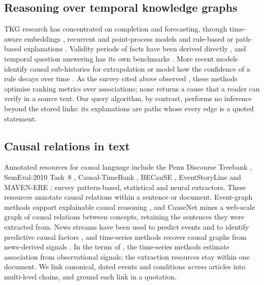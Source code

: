 \documentclass[pdflatex,sn-basic,lineno]{sn-jnl}
\theoremstyle{thmstylethree}
\theoremstyle{thmstyleone}
\begin{document}
\subsection{Reasoning over temporal knowledge graphs}
TKG research has concentrated on completion and forecasting, through time-aware embeddings
\citep{jiang16,garcia18,lacroix20}, recurrent and point-process models
\citep{knowevolve,dyrep,renet,tgn} and rule-based or path-based explanations \citep{tlogic,xerte}.
Validity periods of facts have been derived directly \citep{leblay}, and temporal question
answering has its own benchmarks \citep{cronkgqa,jia21,multitq}. More recent models identify
causal sub-histories for extrapolation \citep{csi} or model how the confidence of a rule decays
over time \citep{huang24}. As the survey cited above observed \citep{survey}, these methods
optimise ranking metrics over associations; none returns a cause that a reader can verify in a
source text. Our query algorithm, by contrast, performs no inference beyond the stored links: its
explanations are paths whose every edge is a quoted statement.

\subsection{Causal relations in text}
Annotated resources for causal language include the Penn Discourse Treebank \citep{pdtb},
SemEval-2010 Task~8 \citep{semeval}, Causal-TimeBank \citep{mirza}, BECauSE \citep{because},
EventStoryLine \citep{storyline} and MAVEN-ERE \citep{mavenere}; \citet{yangsurvey}
survey pattern-based, statistical and neural extractors. These resources annotate causal relations
within a sentence or document. Event-graph methods support explainable causal reasoning
\citep{excar}, and CauseNet \citep{causenet} mines a web-scale graph of causal relations between
concepts, retaining the sentences they were extracted from. News streams have been used to predict
events \citep{radinsky} and to identify predictive causal factors \citep{balashankar}, and
time-series methods recover causal graphs from news-derived signals \citep{maisonnave,runge}. In
the terms of \citet{pearl}, the time-series methods estimate association from observational
signals; the extraction resources stay within one document. We link canonical, dated events and
conditions \emph{across} articles into multi-level chains, and ground each link in a quotation.
\end{document}
